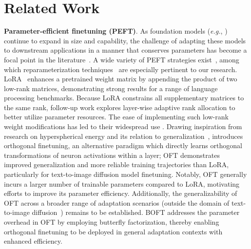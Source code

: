 \section{Related Work}

\textbf{Parameter-efficient finetuning (PEFT)}. As foundation models (\emph{e.g.}, \cite{brown2020language,radford2021learning,rombach2022high,kirillov2023segment}) continue to expand in size and capability, the challenge of adapting these models to downstream applications in a manner that conserves parameters has become a focal point in the literature~\cite{treviso2023efficient,ding2023parameter,lialin2023scaling}. A wide variety of PEFT strategies exist~\cite{houlsby2019parameter,aghajanyan2020intrinsic,hulora2022,edalati2022krona,wang2022adamix,gheini2021cross,zaken2022bitfit,guo2020parameter,sung2021training,ansell2022composable,lester2021power,li2021prefix,vu2022spot,he2021towards,mao2021unipelt,karimi2021compacter,liu2022few,sung2022lst,chen2022parameter,jia2022visual,chen2022adaptformer,zhang2022neural,jie2023fact,lian2022scaling,luo2023towards}, among which reparameterization techniques~\cite{aghajanyan2020intrinsic,hulora2022,edalati2022krona} are especially pertinent to our research. LoRA~\cite{hulora2022} enhances a pretrained weight matrix by appending the product of two low-rank matrices, demonstrating strong results for a range of language processing benchmarks. Because LoRA constrains all supplementary matrices to the same rank, follow-up work \cite{zhang2022adaptive,valipour2022dylora,zhang2023increlora} explores layer-wise adaptive rank allocation to better utilize parameter resources. The ease of implementing such low-rank weight modifications has led to their widespread use \cite{dettmers2023qlora,zi2023delta,chavan2023one}. Drawing inspiration from research on hyperspherical energy and its relation to generalization~\cite{liu2018learning,liu2021orthogonal}, \cite{qiu2023controlling} introduces orthogonal finetuning, an alternative paradigm which directly learns orthogonal transformations of neuron activations within a layer; OFT demonstrates improved generalization and more reliable training trajectories than LoRA, particularly for text-to-image diffusion model finetuning. Notably, OFT generally incurs a larger number of trainable parameters compared to LoRA, motivating efforts to improve its parameter efficiency. Additionally, the generalizability of OFT across a broader range of adaptation scenarios (outside the domain of text-to-image diffusion~\cite{qiu2023controlling}) remains to be established. BOFT addresses the parameter overhead in OFT by employing butterfly factorization, thereby enabling orthogonal finetuning to be deployed in general adaptation contexts with enhanced efficiency.

